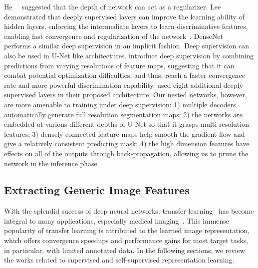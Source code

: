 He~\etal~\citep{he2016deep} suggested that the depth of network can act as a regularizer. Lee~\etal~\citep{lee2015deeply} demonstrated that deeply supervised layers can improve the learning ability of hidden layers, enforcing the intermediate layers to learn discriminative features, enabling  fast convergence and regularization of the network~\citep{dou20173d}. DenseNet~\citep{huang2017densely} performs a similar deep supervision in an implicit fashion. Deep supervision can also be used in U-Net like architectures.
\citet{dou20163d} introduce deep supervision by combining predictions from varying resolutions of feature maps, suggesting that it can combat potential optimization difficulties, and thus, reach a faster convergence rate and more powerful discrimination capability. \citet{zhu2017deeply} used eight additional deeply supervised layers in their proposed architecture. 
Our nested networks, however, are more amenable to training under deep supervision: 1) multiple decoders automatically generate full resolution segmentation maps; 2) the networks are embedded at various different depths of U-Net so that it grasps multi-resolution features; 3) densely connected feature maps help smooth the gradient flow and give a relatively consistent predicting mask; 4) the high dimension features have effects on all of the outputs through back-propagation, allowing us to prune the network in the inference phase.


\subsection{Extracting Generic Image Features}
\label{ch1:related_work:extracting_generic_image_features}

With the splendid success of deep neural networks, transfer learning~\citep{pan2010survey,weiss2016survey,yosinski2014transferable} has become integral to many applications, especially medical imaging~\citep{greenspan2016guest,litjens2017survey,lu2017deep,shen2017deep,wang2017comparison,zhou2017fine,zhou2019models,zhou2021models}. This immense popularity of transfer learning is attributed to the learned image representation, which offers convergence speedups and performance gains for most target tasks, in particular, with limited annotated data. In the following sections, we review the works related to supervised and self-supervised representation learning.


